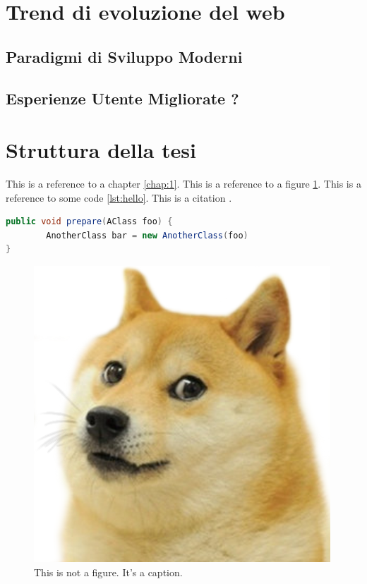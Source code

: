 \section{Trend di evoluzione del web}
\label{sec:Trend}
\subsection{Paradigmi di Sviluppo Moderni}

\subsection{Esperienze Utente Migliorate ?}



\section{Struttura della tesi}
\label{sec:struttura}

This is a reference to a chapter \ref{chap:1}. This is a reference to a figure \ref{fig:doge}. This is a reference to some code \ref{lst:hello}. This is a citation \cite{famous:paper}.



\begin{lstlisting}[language=Java, label=lst:java, caption={Some code in another language than the default one}]
public void prepare(AClass foo) {
        AnotherClass bar = new AnotherClass(foo)
}
\end{lstlisting}


\begin{figure}
\begin{center}
\includegraphics[width=0.3\columnwidth]{images/doge.png}
\end{center}
\caption{This is not a figure. It's a caption.}
\label{fig:doge}
\end{figure}
